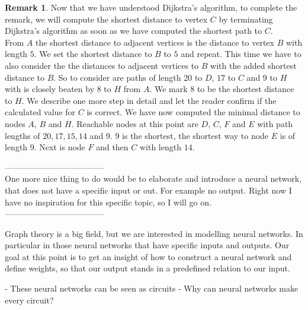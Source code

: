 \documentclass{article}
\theoremstyle{definition}
\newtheorem{example}[theorem]{Remark}
\begin{document}
\begin{example}
Now that we have understood Dijkstra's algorithm, to complete the remark, we will compute the shortest distance to vertex $C$ by terminating Dijkstra's algorithm as soon as we have computed the shortest path to $C$. \\
From $A$ the shortest distance to adjacent vertices is the distance to vertex $B$ with length $5$. We set the shortest distance to $B$ to $5$ and repeat. This time we have to also consider the the distances to adjacent vertices to $B$ with the added shortest distance to $B$. So to consider are paths of length $20$ to $D$, $17$ to $C$ and $9$ to $H$ with is closely beaten by $8$ to $H$ from $A$. We mark $8$ to be the shortest distance to $H$. We describe one more step in detail and let the reader confirm if the calculated value for $C$ is correct. We have now computed the minimal distance to nodes $A$, $B$ and $H$. Reachable nodes at this point are $D$, $C$, $F$ and $E$ with path lengths of $20, 17, 15, 14$ and $9$. $9$ is the shortest, the shortest way to node $E$ is of length $9$. Next is node $F$ and then $C$ with length $14$.

\end{example}

------------------------------------ \\
One more nice thing to do would be to elaborate and introduce a neural network, that does not have a specific input or out. For example no output. Right now I have no inspiration for this specific topic, so I will go on. \\
------------------------------------

Graph theory is a big field, but we are interested in modelling neural networks. In particular in those neural networks that have specific inputs and outputs. Our goal at this point is to get an insight of how to construct a neural network and define weights, so that our output stands in a predefined relation to our input.

- These neural networks can be seen as circuits
- Why can neural networks make every circuit?

\cite{quine1955way}
\end{document}
